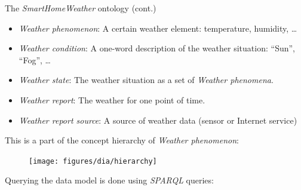 \documentclass[final,hyperref={pdfpagelabels=true}]{beamer}
\begin{document}
\begin{frame}[fragile]
\begin{columns}[t]
\begin{column}{.45\textwidth}
\begin{block}{The \emph{SmartHomeWeather} ontology (cont.)}
	\begin{itemize}
	  \item \emph{Weather phenomenon}: A certain weather
		  element: temperature, humidity, …
	  \item \emph{Weather condition}: A one-word description of the
		  weather situation: ``Sun'', ``Fog'', …
	  \item \emph{Weather state}: The weather situation as a
		  set of \emph{Weather phenomena}.
          \item \emph{Weather report}: The weather for one
		  point of time.
	  \item \emph{Weather report source}: A source of weather data
		  (sensor or Internet service)
	\end{itemize}

	\vspace{.5em}
	
	This is a part of the concept hierarchy of \emph{Weather phenomenon}:
	
	\vspace{1em}

        \begin{figure}
	  \vspace{-.5em}
	  \centering
  	  \texttt{[image: figures/dia/hierarchy]}
	\end{figure}

	\vspace{.5em}
	Querying the data model is done using \emph{SPARQL} queries:

	\vspace{10mm}
	\vspace{-12mm}
	

\end{block}
\end{column}
\end{columns}
\end{frame}
\end{document}
